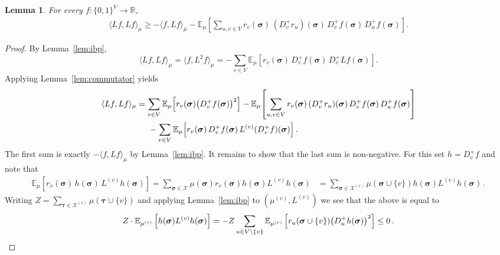 \documentclass[10pt]{amsart}
\newtheorem{lemma}[theorem]{Lemma}
\newcommand{\E}{\mathbb{E}}
\newcommand{\sigmabf}{ \boldsymbol{\sigma} }
\newcommand{\taubf}{ \boldsymbol{\tau} }
\begin{document}
	\begin{lemma}\label{lem:bochner}
		For every $f:\{0,1\}^V\to\mathbb R$,
		\begin{align*}
			\langle Lf,Lf\rangle_\mu
			\ge
			-\langle f,Lf\rangle_\mu
			-
			\E_\mu\!\left[
			\sum_{u,v\in V}
			r_v(\sigmabf)\,(D_v^+r_u)(\sigmabf)\,D_v^+f(\sigmabf)\,D_u^+f(\sigmabf)
			\right].
		\end{align*}
	\end{lemma}
	
	\begin{proof}
		By Lemma~\ref{lem:ibp},
		\[
		\langle Lf,Lf\rangle_\mu
		=
		\langle f,L^2f\rangle_\mu
		=
		-\sum_{v\in V}
		\E_\mu\!\left[
		r_v(\sigmabf)\,D_v^+f(\sigmabf)\,D_v^+Lf(\sigmabf)
		\right].
		\]
		Applying Lemma~\ref{lem:commutator} yields
		\begin{align*}
			\langle Lf,Lf\rangle_\mu
			&=
			\sum_{v\in V}
			\E_\mu\!\left[r_v(\sigmabf)\bigl(D_v^+f(\sigmabf)\bigr)^2\right] 
			-
			\E_\mu\!\left[
			\sum_{u,v\in V}
			r_v(\sigmabf)\,(D_v^+r_u)(\sigmabf)\,D_v^+f(\sigmabf)\,D_u^+f(\sigmabf)
			\right] \\
			&\hspace{0.5 cm}
			-
			\sum_{v\in V}
			\E_\mu\!\left[
			r_v(\sigmabf)\,D_v^+f(\sigmabf)\,L^{(v)}(D_v^+f)(\sigmabf)
			\right].
		\end{align*}
		The first sum is exactly $-\langle f,Lf\rangle_\mu$ by Lemma~\ref{lem:ibp}. It remains to show that the last sum is non-negative. For this set $h=D_v^+f$ and note that 
		\begin{align*}
			\E_\mu\left[
			r_v(\sigmabf)\,h(\sigmabf)\,L^{(v)}h(\sigmabf)
			\right]
			=
			\sum_{\sigmabf\in \mathcal{X}} \mu(\sigmabf)r_v(\sigmabf)h(\sigmabf)L^{(v)}h(\sigmabf)
			&=
			\sum_{\sigmabf\in \mathcal{X}^{(v)}} \mu(\sigmabf \cup \{v\})h(\sigmabf)L^{(v)}h(\sigmabf)\, .
		\end{align*}
		Writing $Z=\sum_{\taubf\in\mathcal X^{(v)}}\mu(\taubf\cup\{v\})$ and 
		applying Lemma~\ref{lem:ibp} to $(\mu^{(v)},L^{(v)})$ we see that the above is equal to
		\[
		Z \cdot \E_{\mu^{(v)}}
		\left[ h(\sigmabf) L^{(v)}h(\sigmabf)
		\right]=-Z\sum_{u \in V\backslash\{v\}} 
		\E_{\mu^{(v)}}\left[ 
		r_u(\sigmabf \cup\{v\})\bigl(D_u^+h(\sigmabf)\bigr)^2
		\right]\leq 0\, . \qedhere
		\]
	\end{proof}
	
\end{document}
